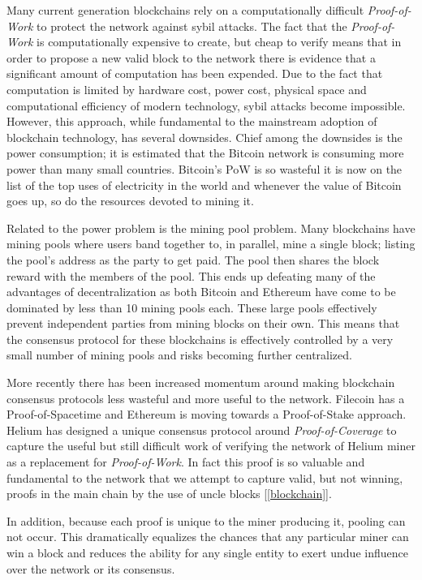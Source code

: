 \documentclass[letterpaper,11pt]{article}
\begin{document}
Many current generation blockchains rely on a computationally difficult \emph{Proof-of-Work} to protect the network against sybil attacks. The fact that the \emph{Proof-of-Work} is computationally expensive to create, but cheap to verify means that in order to propose a new valid block to the network there is evidence that a significant amount of computation has been expended. Due to the fact that computation is limited by hardware cost, power cost, physical space and computational efficiency of modern technology, sybil attacks become impossible. However, this approach, while fundamental to the mainstream adoption of blockchain technology, has several downsides. Chief among the downsides is the power consumption; it is estimated that the Bitcoin network is consuming more power than many small countries. Bitcoin's PoW is so wasteful it is now on the list of the top uses of electricity in the world and whenever the value of Bitcoin goes up, so do the resources devoted to mining it.

Related to the power problem is the mining pool problem. Many blockchains have mining pools where users band together to, in parallel, mine a single block; listing the pool's address as the party to get paid. The pool then shares the block reward with the members of the pool. This ends up defeating many of the advantages of decentralization as both Bitcoin and Ethereum have come to be dominated by less than 10 mining pools each. These large pools effectively prevent independent parties from mining blocks on their own. This means that the consensus protocol for these blockchains is effectively controlled by a very small number of mining pools and risks becoming further centralized.

More recently there has been increased momentum around making blockchain consensus protocols less wasteful and more useful to the network. Filecoin \cite{filecoin} has a Proof-of-Spacetime and Ethereum \cite{ethereum} is moving towards a Proof-of-Stake approach. Helium has designed a unique consensus protocol around \emph{Proof-of-Coverage} to capture the useful but still difficult work of verifying the network of Helium miner as a replacement for \emph{Proof-of-Work}. In fact this proof is so valuable and fundamental to the network that we attempt to capture valid, but not winning, proofs in the main chain by the use of uncle blocks [\ref{blockchain}].

In addition, because each proof is unique to the miner producing it, pooling can not occur. This dramatically equalizes the chances that any particular miner can win a block and reduces the ability for any single entity to exert undue influence over the network or its consensus.
\end{document}
